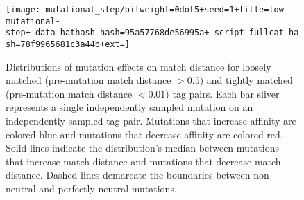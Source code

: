 \begin{figure}
\begin{center}

\texttt{[image: mutational\_step/bitweight=0dot5+seed=1+title=low-mutational-step+\_data\_hathash\_hash=95a57768de56995a+\_script\_fullcat\_hash=78f9965681c3a44b+ext=]}
\caption{
Distributions of mutation effects on match distance for loosely matched (pre-mutation match distance $> 0.5$) and tightly matched (pre-mutation match distance $< 0.01$) tag pairs.
Each bar sliver represents a single independently sampled mutation on an independently sampled tag pair.
Mutations that increase affinity are colored blue and mutations that decrease affinity are colored red.
Solid lines indicate the distribution's median between mutations that increase match distance and mutations that decrease match distance.
Dashed lines demarcate the boundaries between non-neutral and perfectly neutral mutations.
}
\label{fig:mutational_step}

\end{center}
\end{figure}
